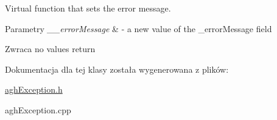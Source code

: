 Virtual function that sets the error message. 


\begin{DoxyParams}{Parametry}
{\em \+\_\+\+\_\+error\+Message} & -\/ a new value of the \+\_\+error\+Message field \\
\hline
\end{DoxyParams}
\begin{DoxyReturn}{Zwraca}
no values return 
\end{DoxyReturn}


Dokumentacja dla tej klasy została wygenerowana z plików\+:\begin{DoxyCompactItemize}
\item 
\hyperlink{aghException_8h}{agh\+Exception.\+h}\item 
agh\+Exception.\+cpp\end{DoxyCompactItemize}
